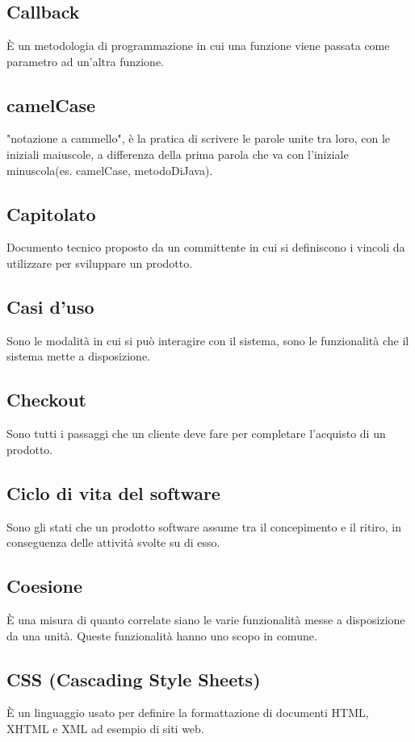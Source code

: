 \section{}

\subsection*{Callback} È un metodologia di programmazione in cui una funzione viene passata come parametro ad un'altra funzione.

\subsection*{camelCase} "notazione a cammello", è la pratica di scrivere le parole unite tra loro, con le iniziali maiuscole, a differenza della prima parola che va con l'iniziale minuscola(es. camelCase, metodoDiJava).

\subsection*{Capitolato} Documento tecnico proposto da un committente in cui si definiscono i vincoli da utilizzare per sviluppare un prodotto.

\subsection*{Casi d'uso} Sono le modalità in cui si può interagire con il sistema, sono le funzionalità che il sistema mette a disposizione.

\subsection*{Checkout} Sono tutti i passaggi che un cliente deve fare per completare l'acquisto di un prodotto.

\subsection*{Ciclo di vita del software} Sono gli stati che un prodotto software assume tra il concepimento e il ritiro, in conseguenza delle attività svolte su di esso.

\subsection*{Coesione} È una misura di quanto correlate siano le varie funzionalità messe a disposizione da una unità. Queste funzionalità hanno uno scopo in comune.

\subsection*{CSS (Cascading Style Sheets)} È un linguaggio usato per definire la formattazione di documenti HTML, XHTML e XML ad esempio di siti web.

